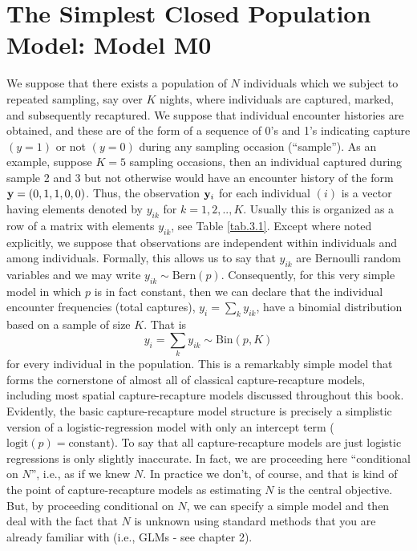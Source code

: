 \section{The Simplest Closed Population Model: Model M0}

We suppose that there exists a population of $N$ individuals which we
subject to repeated sampling, say over $K$ nights, where individuals
are captured, marked, and subsequently recaptured.  We suppose that
individual encounter histories are obtained, and these are of the form
of a sequence of 0's and 1's indicating capture $(y=1)$ or not $(y=0)$
during any sampling occasion (``sample'').  As an example, suppose
$K=5$ sampling occasions, then an individual captured during sample 2
and 3 but not otherwise would have an encounter history of the form
${\bf y}=(0,1,1,0,0)$. Thus, the observation ${\bf y}_{i}$ for each
individual $(i)$ is a vector having elements denoted by $y_{ik}$ for
$k=1,2,..,K$. Usually this is organized as a row of a matrix with
elements $y_{ik}$, see Table \ref{tab.3.1}.  Except where noted
explicitly, we suppose that observations are independent within
individuals and among individuals.  Formally, this allows us to say
that $y_{ik}$ are Bernoulli random variables and we may write $y_{ik}
\sim \mbox{Bern}(p)$.  Consequently, for this very simple model in
which $p$ is in fact constant, then we can declare that the individual
encounter frequencies (total captures), $y_{i} = \sum_{k} y_{ik}$,
have a binomial distribution based on a sample of size $K$. That is
\[
y_{i}  = \sum_{k} y_{ik} \sim \mbox{Bin}(p,K) 
\]
for every individual in the population. This is a remarkably simple
model that forms the cornerstone of almost all of classical
capture-recapture models, including most spatial capture-recapture
models discussed throughout this book.  Evidently, the basic
capture-recapture model structure is precisely a simplistic version of
a logistic-regression model with only an intercept term
($\mbox{logit}(p) = \mbox{constant}$).  To say that all
capture-recapture models are just logistic regressions is only
slightly inaccurate. In fact, we are proceeding here ``conditional on
$N$'', i.e., as if we knew $N$. In practice we don't, of course, and
that is kind of the point of capture-recapture models as estimating
$N$ is the central objective. But, by proceeding conditional on $N$,
we can specify a simple model and then deal with the fact that $N$ is
unknown using standard methods that you are already familiar with
(i.e., GLMs - see chapter 2).
